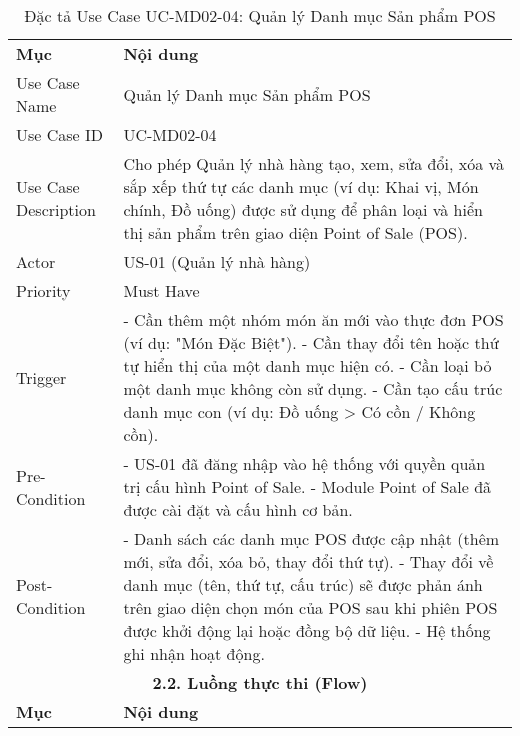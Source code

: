 \begin{longtable}{|m{4cm}|p{11cm}|}
\caption{Đặc tả Use Case UC-MD02-04: Quản lý Danh mục Sản phẩm POS} \label{tab:uc_md02_04} \\
\hline

\endhead %

\hline
\endfoot %

\hline
\endlastfoot %
\multicolumn{2}{|c|}{\textbf{2.1. Tóm tắt (Summary)}} \\
\hline
\textbf{Mục} & \textbf{Nội dung} \\
\hline
Use Case Name & Quản lý Danh mục Sản phẩm POS \\
\hline
Use Case ID & UC-MD02-04 \\
\hline
Use Case Description & Cho phép Quản lý nhà hàng tạo, xem, sửa đổi, xóa và sắp xếp thứ tự các danh mục (ví dụ: Khai vị, Món chính, Đồ uống) được sử dụng để phân loại và hiển thị sản phẩm trên giao diện Point of Sale (POS). \\
\hline
Actor & US-01 (Quản lý nhà hàng) \\
\hline
Priority & Must Have \\
\hline
Trigger & - Cần thêm một nhóm món ăn mới vào thực đơn POS (ví dụ: "Món Đặc Biệt"). \newline - Cần thay đổi tên hoặc thứ tự hiển thị của một danh mục hiện có. \newline - Cần loại bỏ một danh mục không còn sử dụng. \newline - Cần tạo cấu trúc danh mục con (ví dụ: Đồ uống > Có cồn / Không cồn). \\
\hline
Pre-Condition & - US-01 đã đăng nhập vào hệ thống với quyền quản trị cấu hình Point of Sale. \newline - Module Point of Sale đã được cài đặt và cấu hình cơ bản. \\
\hline
Post-Condition & - Danh sách các danh mục POS được cập nhật (thêm mới, sửa đổi, xóa bỏ, thay đổi thứ tự). \newline - Thay đổi về danh mục (tên, thứ tự, cấu trúc) sẽ được phản ánh trên giao diện chọn món của POS sau khi phiên POS được khởi động lại hoặc đồng bộ dữ liệu. \newline - Hệ thống ghi nhận hoạt động. \\
\hline
\multicolumn{2}{|c|}{\textbf{2.2. Luồng thực thi (Flow)}} \\
\hline
\textbf{Mục} & \textbf{Nội dung} \\
\hline

\end{longtable}
